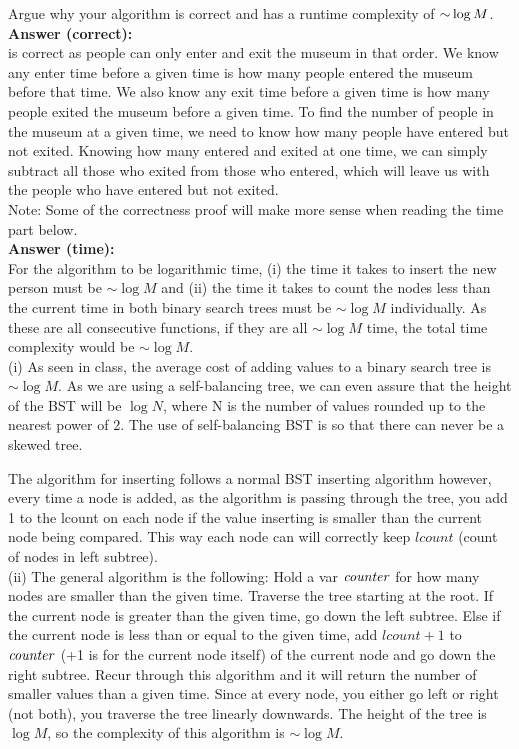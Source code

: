 \begin{problem}
\begin{questions}
\item Argue why your algorithm  is correct and has a runtime complexity of $\mathord{\sim}\log M$.\\
\textbf{Answer (correct):}\\
 is correct as people can only enter and exit the museum in that order. We know any enter time before a given time is how many people entered the museum before that time. We also know any exit time before a given time is how many people exited the museum before a given time. To find the number of people in the museum at a given time, we need to know how many people have entered but not exited. Knowing how many entered and exited at one time, we can simply subtract all those who exited from those who entered, which will leave us with the people who have entered but not exited.\\

Note: Some of the correctness proof will make more sense when reading the time part below.\\

\textbf{Answer (time):}\\
For the algorithm to be logarithmic time, (i) the time it takes to insert the new person must be $\sim \log M$ and (ii) the time it takes to count the nodes less than the current time in both binary search trees must be $\sim \log M$ individually. As these are all consecutive functions, if they are all $\sim \log M$ time, the total time complexity would be $\sim \log M$.\\

(i) As seen in class, the average cost of adding values to a binary search tree is $\sim \log M$. As we are using a self-balancing tree, we can even assure that the height of the BST will be $\log N$, where N is the number of values rounded up to the nearest power of 2. The use of self-balancing BST is so that there can never be a skewed tree.

The algorithm for inserting follows a normal BST inserting algorithm however, every time a node is added, as the algorithm is passing through the tree, you add 1 to the lcount on each node if the value inserting is smaller than the current node being compared. This way each node can will correctly keep $lcount$ (count of nodes in left subtree).\\

(ii) The general algorithm is the following: Hold a var $\textit{counter\/}$ for how many nodes are smaller than the given time. Traverse the tree starting at the root. If the current node is greater than the given time, go down the left subtree. Else if the current node is less than or equal to the given time, add $lcount+1$ to $\textit{counter\/}$ (+1 is for the current node itself) of the current node and go down the right subtree. Recur through this algorithm and it will return the number of smaller values than a given time. Since at every node, you either go left or right (not both), you traverse the tree linearly downwards. The height of the tree is $\log M$, so the complexity of this algorithm is $\sim \log M$.\\


\end{questions}
\end{problem}
